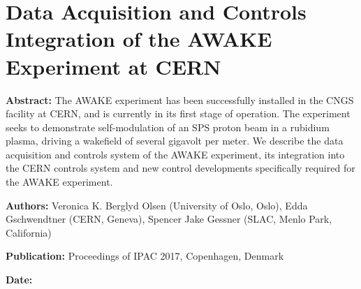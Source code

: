 %
%

\chapter{Data Acquisition and Controls Integration of the AWAKE Experiment at CERN}
\label{Pub:IPAC17}

\begin{hangparas}{10mm}{1}

    \textbf{Abstract:}
    The AWAKE experiment has been successfully installed in the CNGS facility at CERN, and is
    currently in its first stage of operation. The experiment seeks to demonstrate self-modulation
    of an SPS proton beam in a rubidium plasma, driving a wakefield of several gigavolt per meter.
    We describe the data acquisition and controls system of the AWAKE experiment, its integration
    into the CERN controls system and new control developments specifically required for the AWAKE
    experiment.

    \vspace{8mm}

    \textbf{Authors:}
    Veronica K. Berglyd Olsen (University of Oslo, Oslo),
    Edda Gschwendtner (CERN, Geneva),
    Spencer Jake Gessner (SLAC, Menlo Park, California)

    \vspace{5mm}

    \textbf{Publication:}
    Proceedings of IPAC 2017, Copenhagen, Denmark

    \vspace{5mm}

    \textbf{Date:}

\end{hangparas}
